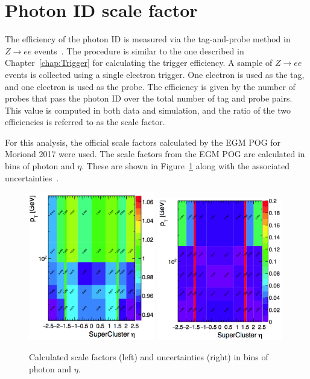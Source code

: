 
\section{Photon ID scale factor}
\label{sec:phoSF}
The efficiency of the photon ID is measured via the tag-and-probe method in $Z \rightarrow ee$ events~\cite{phoPerf8TeV}. 
The procedure is similar to the one described in Chapter~\ref{chap:Trigger} for calculating the trigger efficiency.
A sample of $Z \rightarrow ee$ events is collected using a single electron trigger. One electron is used as the tag, and 
one electron is used as the probe. The efficiency is given by the number of probes that pass the photon ID over the 
total number of tag and probe pairs. This value is computed in both data and simulation,
and the ratio of the two efficiencies is referred to as the scale factor. 

For this analysis, the official
scale factors calculated by the EGM POG for Moriond 2017 were used.
The scale factors from the EGM POG are calculated in bins of photon \pt and
$\eta$. These are shown in Figure~\ref{fig:SF} along with the
associated uncertainties~\cite{SF_twiki}.

\begin{figure}[htbp]
    \centering
    \includegraphics[width=0.49\textwidth]{Figures/EventSelect/scalefactors.png}
    \includegraphics[width=0.49\textwidth]{Figures/EventSelect/sf_errors.png}
    \caption{Calculated scale factors (left) and uncertainties (right)
      in bins of photon \pt and $\eta$.}
    \label{fig:SF}
\end{figure}

